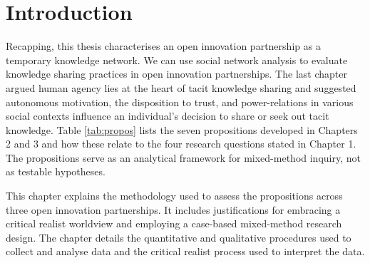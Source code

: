 \section{Introduction}

Recapping, this thesis characterises an open innovation partnership as a temporary knowledge network. We can use social network analysis to evaluate knowledge sharing practices in open innovation partnerships. The last chapter argued human agency lies at the heart of tacit knowledge sharing and suggested autonomous motivation, the disposition to trust, and power-relations in various social contexts influence an individual's decision to share or seek out tacit knowledge. Table \ref{tab:propos} lists the seven propositions developed in Chapters 2 and 3 and how these relate to the four research questions stated in Chapter 1. The propositions serve as an analytical framework for mixed-method inquiry, not as testable hypotheses. \medskip

This chapter explains the methodology used to assess the propositions across three open innovation partnerships. It includes justifications for embracing a critical realist worldview and employing a case-based mixed-method research design. The chapter details the quantitative and qualitative procedures used to collect and analyse data and the critical realist process used to interpret the data. 

